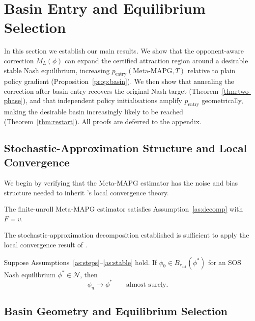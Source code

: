\documentclass{nextgame2026} %
\begin{document}
\section{Basin Entry and Equilibrium Selection}\label{sec:main}

In this section we establish our main results. We show that the 
opponent-aware correction $M_L(\phi)$ can expand the certified 
attraction region around a desirable stable Nash equilibrium, increasing 
$p_{\mathrm{entry}}(\text{Meta-MAPG}, T)$ relative to plain policy 
gradient (Proposition~\ref{prop:basin}). We then show that annealing 
the correction after basin entry recovers the original Nash target 
(Theorem~\ref{thm:two-phase}), and that independent policy initialisations amplify $p_{\mathrm{entry}}$ geometrically, making the desirable basin increasingly likely to be reached (Theorem~\ref{thm:restart}). All 
proofs are deferred to the appendix.

\subsection{Stochastic-Approximation Structure and Local Convergence}

We begin by verifying that the Meta-MAPG estimator has the noise and 
bias structure needed to inherit \citet{giannou2022convergence}'s local 
convergence theory.
 
\begin{lemma}\label{lem:decomp}
The finite-unroll Meta-MAPG estimator satisfies Assumption~\ref{as:decomp} 
with $F = v$.
\end{lemma}

The stochastic-approximation decomposition established is sufficient to apply the local convergence result of \citet{giannou2022convergence}.

\begin{lemma}\label{lem:local}
Suppose Assumptions~\ref{as:steps}--\ref{as:stable} hold. If 
$\phi_0 \in B_{r_{\mathrm{att}}}(\phi^*)$ for an SOS Nash equilibrium 
$\phi^* \in \mathcal{N}$, then
\[
\phi_n \to \phi^* \qquad \text{almost surely.}
\]
\end{lemma} 

\subsection{Basin Geometry and Equilibrium Selection}
\end{document}
